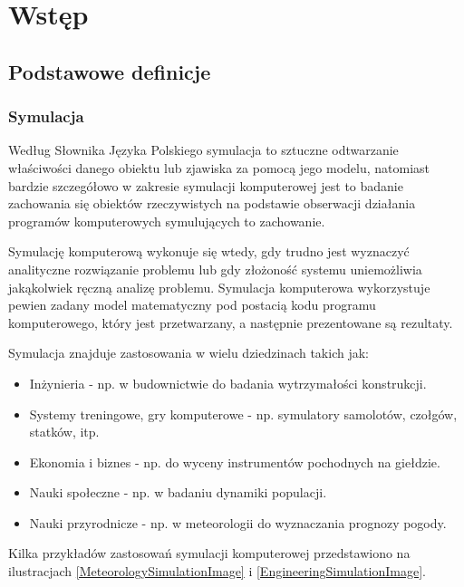 \documentclass[12pt, oneside]{report}
\theoremstyle{definition}
\begin{document}
\vspace{\fill}

\newpage
\pagestyle{plain}
\setcounter{page}{5}
\tableofcontents

\newpage
\pagestyle{headings}

\chapter{Wstęp}
\section{Podstawowe definicje}
\subsection{Symulacja}
Według Słownika Języka Polskiego \cite{PWNSymulacja} symulacja to sztuczne odtwarzanie właściwości danego obiektu lub zjawiska za pomocą jego modelu, natomiast bardzie szczegółowo w zakresie symulacji komputerowej jest to badanie zachowania się obiektów rzeczywistych na podstawie obserwacji działania programów komputerowych symulujących to zachowanie.


Symulację komputerową wykonuje się wtedy, gdy trudno jest wyznaczyć analityczne rozwiązanie problemu lub gdy złożoność systemu uniemożliwia jakąkolwiek ręczną analizę problemu. Symulacja komputerowa wykorzystuje pewien zadany model matematyczny pod postacią kodu programu komputerowego, który jest przetwarzany, a następnie prezentowane są rezultaty.

Symulacja znajduje zastosowania w wielu dziedzinach takich jak:
\begin{itemize}
\item Inżynieria - np. w budownictwie do badania wytrzymałości konstrukcji.
\item Systemy treningowe, gry komputerowe - np. symulatory samolotów, czołgów, statków, itp.
\item Ekonomia i biznes - np. do wyceny instrumentów pochodnych na giełdzie. 
\item Nauki społeczne - np. w badaniu dynamiki populacji.
\item Nauki przyrodnicze - np. w meteorologii do wyznaczania prognozy pogody.
\end{itemize}

\newpage
Kilka przykładów zastosowań symulacji komputerowej przedstawiono na ilustracjach \ref{MeteorologySimulationImage} i \ref{EngineeringSimulationImage}.
\end{document}

